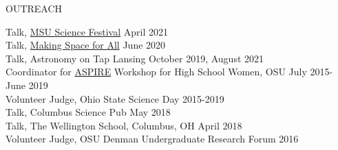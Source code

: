 \documentclass{resume} %
\begin{document}

\begin{rSection}{OUTREACH}

Talk, \href{https://sciencefestival.msu.edu/schools/virtual-school-programs}{MSU Science Festival} \hfill April 2021 \\
Talk, \href{https://astronomy.osu.edu/events/making-space-all-chasing-ghost-particle}{Making Space for All} \hfill June 2020 \\
Talk, Astronomy on Tap Lansing \hfill October 2019, August 2021 \\
Coordinator for \href{u.osu.edu/aspire}{ASPIRE} Workshop for High School Women, OSU \hfill July 2015-June 2019\\
Volunteer Judge, Ohio State Science Day \hfill 2015-2019\\
Talk, Columbus Science Pub \hfill  May 2018\\
Talk, The Wellington School, Columbus, OH \hfill April 2018\\
Volunteer Judge, OSU Denman Undergraduate Research Forum \hfill 2016\\
\end{rSection}
\vspace{-0.30cm}
\end{document}
